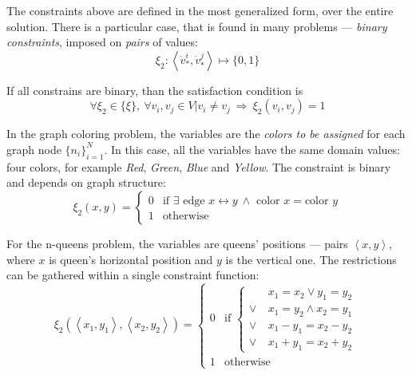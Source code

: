 \documentclass[ThesisDoc]{subfiles}
\begin{document}
The constraints above are defined in the most generalized form,
over the entire solution. There is a particular case, that is found in many problems
--- \emph{binary constraints}, imposed on \emph{pairs} of values:
$$\xi_2 : \left< {\dot v}^i_\ast, {\dot v}^j_\ast \right> \mapsto \{0,1\}$$

If all constrains are binary, than the satisfaction condition is
$$\forall \xi_2     \in \{\xi\},~
  \forall v_i, v_j  \in V | v_i \not= v_j
~ \Rightarrow ~ \xi_2(v_i, v_j) = 1
$$

\medskip

In the graph coloring problem, the variables are the \emph{colors to be assigned}
for each graph node $\{n_i\}_{i=1}^N$. In this case, all the variables have
the same domain values: four colors, for example \textit{Red}, \textit{Green},
\textit{Blue} and \textit{Yellow}. The constraint is binary and depends on graph
structure:
$$ \xi_2(x,y)= \begin{cases}
  0 & \mbox{if } \exists \text{~edge~} x \leftrightarrow y
                ~\land \text{~color~} x = \text{color~} y \\
  1 & \text{otherwise}
\end{cases}
$$


For the n-queens problem, the variables are queens' positions ---
pairs $\left< x,y \right>$, where $x$ is queen's horizontal position and
$y$ is the vertical one. The restrictions can be gathered within a single
constraint function:
$$\xi_2(\left<x_1,y_1\right>, \left<x_2,y_2\right>) =
    \begin{cases}
      0 & \mbox{if } \begin{cases}
                        &      x_1 = x_2  \lor y_1 = y_2 \\
                        \lor~& x_1 = y_2 \land x_2 = y_1 \\
                        \lor~& x_1-y_1 = x_2-y_2\\
                        \lor~& x_1+y_1 = x_2+y_2
                     \end{cases} \\
     1 & \text{otherwise}
    \end{cases}
$$
\end{document}
